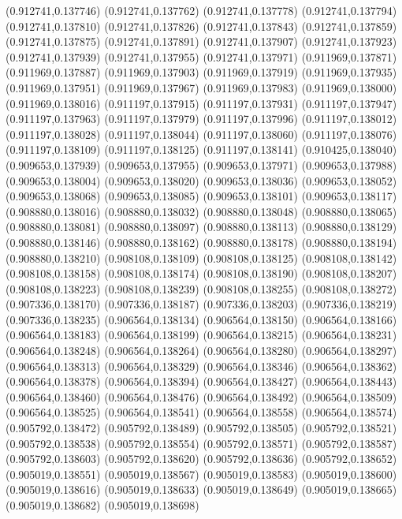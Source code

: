 (0.912741,0.137746)
(0.912741,0.137762)
(0.912741,0.137778)
(0.912741,0.137794)
(0.912741,0.137810)
(0.912741,0.137826)
(0.912741,0.137843)
(0.912741,0.137859)
(0.912741,0.137875)
(0.912741,0.137891)
(0.912741,0.137907)
(0.912741,0.137923)
(0.912741,0.137939)
(0.912741,0.137955)
(0.912741,0.137971)
(0.911969,0.137871)
(0.911969,0.137887)
(0.911969,0.137903)
(0.911969,0.137919)
(0.911969,0.137935)
(0.911969,0.137951)
(0.911969,0.137967)
(0.911969,0.137983)
(0.911969,0.138000)
(0.911969,0.138016)
(0.911197,0.137915)
(0.911197,0.137931)
(0.911197,0.137947)
(0.911197,0.137963)
(0.911197,0.137979)
(0.911197,0.137996)
(0.911197,0.138012)
(0.911197,0.138028)
(0.911197,0.138044)
(0.911197,0.138060)
(0.911197,0.138076)
(0.911197,0.138109)
(0.911197,0.138125)
(0.911197,0.138141)
(0.910425,0.138040)
(0.909653,0.137939)
(0.909653,0.137955)
(0.909653,0.137971)
(0.909653,0.137988)
(0.909653,0.138004)
(0.909653,0.138020)
(0.909653,0.138036)
(0.909653,0.138052)
(0.909653,0.138068)
(0.909653,0.138085)
(0.909653,0.138101)
(0.909653,0.138117)
(0.908880,0.138016)
(0.908880,0.138032)
(0.908880,0.138048)
(0.908880,0.138065)
(0.908880,0.138081)
(0.908880,0.138097)
(0.908880,0.138113)
(0.908880,0.138129)
(0.908880,0.138146)
(0.908880,0.138162)
(0.908880,0.138178)
(0.908880,0.138194)
(0.908880,0.138210)
(0.908108,0.138109)
(0.908108,0.138125)
(0.908108,0.138142)
(0.908108,0.138158)
(0.908108,0.138174)
(0.908108,0.138190)
(0.908108,0.138207)
(0.908108,0.138223)
(0.908108,0.138239)
(0.908108,0.138255)
(0.908108,0.138272)
(0.907336,0.138170)
(0.907336,0.138187)
(0.907336,0.138203)
(0.907336,0.138219)
(0.907336,0.138235)
(0.906564,0.138134)
(0.906564,0.138150)
(0.906564,0.138166)
(0.906564,0.138183)
(0.906564,0.138199)
(0.906564,0.138215)
(0.906564,0.138231)
(0.906564,0.138248)
(0.906564,0.138264)
(0.906564,0.138280)
(0.906564,0.138297)
(0.906564,0.138313)
(0.906564,0.138329)
(0.906564,0.138346)
(0.906564,0.138362)
(0.906564,0.138378)
(0.906564,0.138394)
(0.906564,0.138427)
(0.906564,0.138443)
(0.906564,0.138460)
(0.906564,0.138476)
(0.906564,0.138492)
(0.906564,0.138509)
(0.906564,0.138525)
(0.906564,0.138541)
(0.906564,0.138558)
(0.906564,0.138574)
(0.905792,0.138472)
(0.905792,0.138489)
(0.905792,0.138505)
(0.905792,0.138521)
(0.905792,0.138538)
(0.905792,0.138554)
(0.905792,0.138571)
(0.905792,0.138587)
(0.905792,0.138603)
(0.905792,0.138620)
(0.905792,0.138636)
(0.905792,0.138652)
(0.905019,0.138551)
(0.905019,0.138567)
(0.905019,0.138583)
(0.905019,0.138600)
(0.905019,0.138616)
(0.905019,0.138633)
(0.905019,0.138649)
(0.905019,0.138665)
(0.905019,0.138682)
(0.905019,0.138698)
